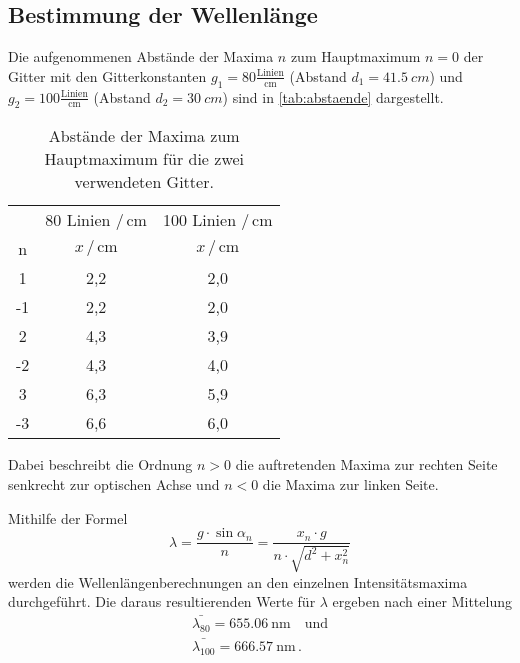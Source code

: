 \subsection{Bestimmung der Wellenlänge} \label{sec:lambda}
Die aufgenommenen Abstände der Maxima $n$ zum Hauptmaximum $n = 0$ der Gitter mit den Gitterkonstanten $g_1 = 80 \frac{\text{Linien}}{\unit{\centi\meter}}$ (Abstand $d_1 = \qty{41,5}{cm}$) und
$g_2 = 100 \frac{\text{Linien}}{\unit{\centi\meter}}$ (Abstand $d_2 = \qty{30}{cm}$) sind in \autoref{tab:abstaende} dargestellt.
\begin{table}
    \centering
    \caption{Abstände der Maxima zum Hauptmaximum für die zwei verwendeten Gitter.}
    \label{tab:abstaende}
    \begin{tabular}{c c c}
        \toprule
           &  80 Linien $/ \, \mathrm{cm}$ &  100 Linien $/ \, \mathrm{cm}$ \\
         n &  $x \, / \, \mathrm{cm}$ &  $x \, / \, \mathrm{cm}$ \\
        \midrule
         1 &     2,2 &       2,0 \\
        -1 &     2,2 &       2,0 \\
         2 &     4,3 &       3,9 \\
        -2 &     4,3 &       4,0 \\
         3 &     6,3 &       5,9 \\
        -3 &     6,6 &       6,0 \\
        \bottomrule
    \end{tabular}
\end{table}
Dabei beschreibt die Ordnung $n>0$ die auftretenden Maxima zur rechten Seite
senkrecht zur optischen Achse und $n<0$ die Maxima zur linken Seite.

Mithilfe der Formel
\begin{equation}
    \lambda=\frac{g \cdot \sin \alpha_n}{n} = \frac{x_n \cdot g}{n \cdot \sqrt{d^2+x_n^2}}
\end{equation} 
werden die Wellenlängenberechnungen an den einzelnen Intensitätsmaxima durchgeführt. 
Die daraus resultierenden Werte für $\lambda$ ergeben nach einer Mittelung
\begin{align*}
    \bar{\lambda_{80}} = \qty{655.06}{\nano\meter} \quad \text{und} \\
    \bar{\lambda_{100}} = \qty{666.57}{\nano\meter} \, .
\end{align*}
